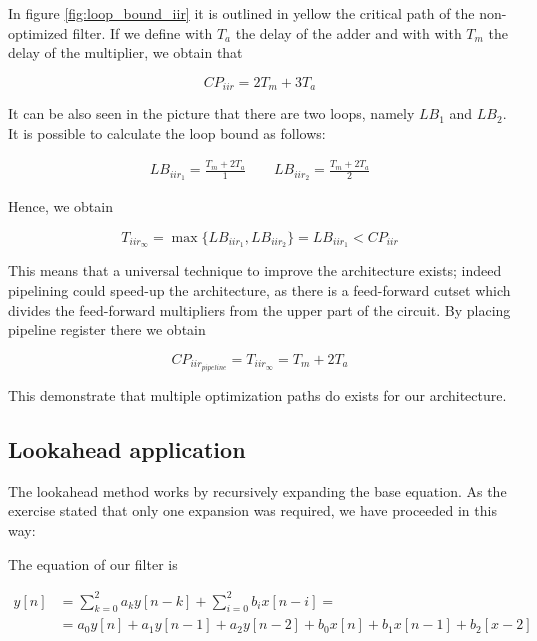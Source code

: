 In figure \ref{fig:loop_bound_iir} it is outlined in yellow the critical path of the non-optimized filter. If we define with
$T_{a}$ the delay of the adder and with with $T_{m}$ the delay of the multiplier, we obtain that

\begin{equation}
    \label{eq:baseline_iir_delay}
    CP_{iir} = 2T_{m} + 3T_{a}
\end{equation}

It can be also seen in the picture that there are two loops, namely $LB_{1}$ and $LB_{2}$. It is possible to calculate the
loop bound as follows:

\begin{align}\nonumber
    LB_{iir_{1}} = \frac{T_{m} + 2T_{a}}{1} \quad\quad LB_{iir_{2}} = \frac{T_{m} + 2T_{a}}{2}
\end{align}

Hence, we obtain

\begin{equation}\nonumber
    T_{iir_{\infty}} = \max \lbrace LB_{iir_{1}}, LB_{iir_{2}} \rbrace = LB_{iir_{1}} < CP_{iir}
\end{equation}

This means that a universal technique to improve the architecture exists; indeed pipelining could speed-up the architecture,
as there is a feed-forward cutset which divides the feed-forward multipliers from the upper part of the circuit. By placing
pipeline register there we obtain

\begin{equation}
    CP_{iir_{pipeline}} = T_{iir_{\infty}} = T_{m} + 2T_{a}
\end{equation}

This demonstrate that multiple optimization paths do exists for our architecture.

\subsection{Lookahead application}

The lookahead method works by recursively expanding the base equation. As the exercise stated that only one expansion was required,
we have proceeded in this way:

The equation of our filter is

\begin{equation}
    \label{eq:iir_eq}
    \begin{split}
        y[n] &= {\sum_{k=0}^{2} a_{k}y[n-k]} + {\sum_{i=0}^{2} b_{i}x[n-i]} = \\
        &= a_{0}y[n] + a_{1}y[n-1] + a_{2}y[n-2] + b_{0}x[n] + b_{1}x[n-1] + b_2[x-2]
    \end{split}
\end{equation}

